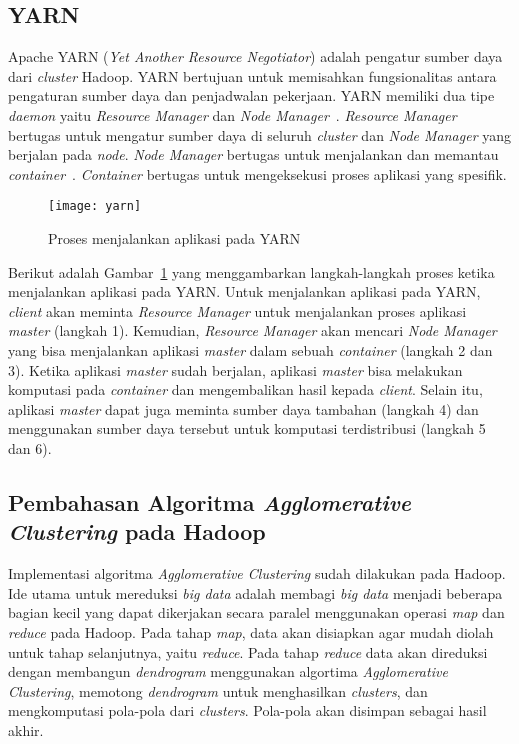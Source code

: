 \subsection{YARN}

Apache YARN (\textit{Yet Another Resource Negotiator}) adalah pengatur sumber daya dari \textit{cluster} Hadoop. YARN bertujuan untuk memisahkan fungsionalitas antara pengaturan sumber daya dan penjadwalan pekerjaan. YARN memiliki dua tipe \textit{daemon} yaitu \textit{Resource Manager} dan \textit{Node Manager}~\cite{tomwhite:05:htdg}.  \textit{Resource Manager} bertugas untuk mengatur sumber daya di seluruh \textit{cluster} dan \textit{Node Manager} yang berjalan pada \textit{node}. \textit{Node Manager} bertugas untuk menjalankan dan memantau \textit{container}~\cite{tomwhite:05:htdg}. \textit{Container} bertugas untuk mengeksekusi proses aplikasi yang spesifik.

\begin{figure}[H]
    \centering  
    \texttt{[image: yarn]}  
    \caption[Proses menjalankan aplikasi pada YARN]{Proses menjalankan aplikasi pada YARN} 
    \label{fig:yarn} 
\end{figure}

Berikut adalah Gambar~\ref{fig:yarn} yang menggambarkan langkah-langkah proses ketika menjalankan aplikasi pada YARN. Untuk menjalankan aplikasi pada YARN, \textit{client} akan meminta \textit{Resource Manager} untuk menjalankan proses aplikasi \textit{master} (langkah 1). Kemudian, \textit{Resource Manager} akan mencari \textit{Node Manager} yang bisa menjalankan aplikasi \textit{master} dalam sebuah \textit{container} (langkah 2 dan 3). Ketika aplikasi \textit{master} sudah berjalan, aplikasi \textit{master} bisa melakukan komputasi pada \textit{container} dan mengembalikan hasil kepada \textit{client}. Selain itu, aplikasi \textit{master} dapat juga meminta sumber daya tambahan (langkah 4) dan menggunakan sumber daya tersebut untuk komputasi terdistribusi (langkah 5 dan 6).\\


\subsection{Pembahasan Algoritma \textit{Agglomerative Clustering} pada Hadoop~\cite{veronica:02:bdhca}}

Implementasi algoritma \textit{Agglomerative Clustering} sudah dilakukan pada Hadoop. Ide utama untuk mereduksi \textit{big data} adalah membagi \textit{big data} menjadi beberapa bagian kecil yang dapat dikerjakan secara paralel menggunakan operasi \textit{map} dan \textit{reduce} pada Hadoop. Pada tahap \textit{map}, data akan disiapkan agar mudah diolah untuk tahap selanjutnya, yaitu \textit{reduce}. Pada tahap \textit{reduce} data akan direduksi dengan membangun \textit{dendrogram} menggunakan algortima \textit{Agglomerative Clustering}, memotong \textit{dendrogram} untuk menghasilkan \textit{clusters}, dan mengkomputasi pola-pola dari \textit{clusters}. Pola-pola akan disimpan sebagai hasil akhir.\\

